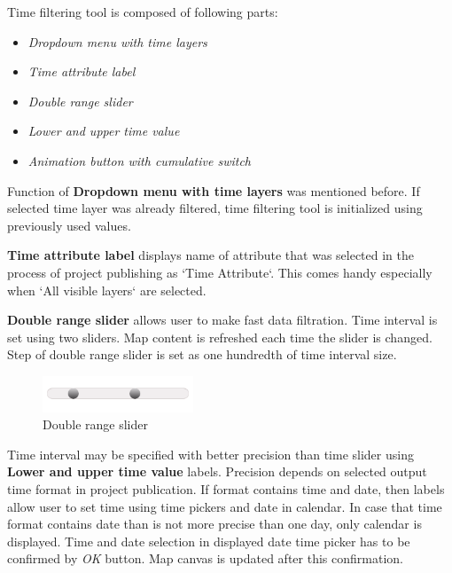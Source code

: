 Time filtering tool is composed of following parts:

\begin{itemize}
	\item\textit{Dropdown menu with time layers}
	\item\textit{Time attribute label}
	\item\textit{Double range slider}
	\item\textit{Lower and upper time value}
	\item\textit{Animation button with cumulative switch}
\end{itemize}

Function of \textbf{Dropdown menu with time layers} was mentioned before.
If selected time layer was already filtered, time filtering 
tool is initialized using previously used values.

\textbf{Time attribute label} displays name of attribute that was selected
in the process of project publishing as `Time Attribute`. This 
comes handy especially when `All visible layers` are selected.

\textbf{Double range slider} allows user to make fast data filtration.
Time interval is set using two sliders. Map content is refreshed 
each time the slider is changed. Step of double range slider is set 
as one hundredth of time interval size.

\begin{figure}[h!]
	\centering
	\includegraphics[width=0.4\textwidth]{../img/time-slider.png}
	\caption{Double range slider}
	\label{fig:time-slider}
\end{figure}

Time interval may be specified with better precision than time 
slider using \textbf{Lower and upper time value} labels. Precision depends
on selected output time format in project publication. If format 
contains time and date, then labels allow user to set time using time
pickers and date in calendar. In case that time format contains date 
than is not more precise than one day, only calendar is displayed. 
Time and date 
selection in displayed date time picker has to be confirmed by 
\textit{OK} button. Map canvas is updated after this confirmation.

